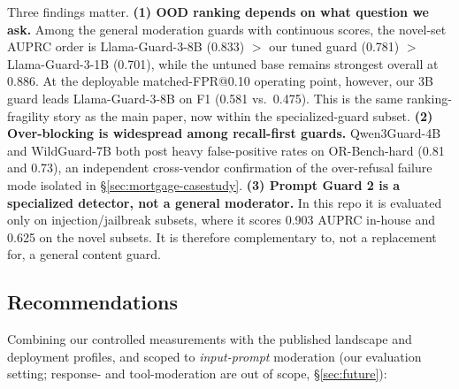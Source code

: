 Three findings matter. \textbf{(1) OOD ranking depends on what question we ask.} Among the general moderation guards with continuous scores, the novel-set AUPRC order is Llama-Guard-3-8B (0.833) $>$ our tuned guard (0.781) $>$ Llama-Guard-3-1B (0.701), while the untuned base remains strongest overall at 0.886. At the deployable matched-FPR@0.10 operating point, however, our 3B guard leads Llama-Guard-3-8B on F1 (0.581 vs.\ 0.475). This is the same ranking-fragility story as the main paper, now within the specialized-guard subset. \textbf{(2) Over-blocking is widespread among recall-first guards.} Qwen3Guard-4B and WildGuard-7B both post heavy false-positive rates on OR-Bench-hard (0.81 and 0.73), an independent cross-vendor confirmation of the over-refusal failure mode isolated in \S\ref{sec:mortgage-casestudy}. \textbf{(3) Prompt Guard 2 is a specialized detector, not a general moderator.} In this repo it is evaluated only on injection/jailbreak subsets, where it scores 0.903 AUPRC in-house and 0.625 on the novel subsets. It is therefore complementary to, not a replacement for, a general content guard.

\subsection{Recommendations}
\label{sec:recommendations}

Combining our controlled measurements with the published landscape and deployment profiles, and scoped to \emph{input-prompt} moderation (our evaluation setting; response- and tool-moderation are out of scope, \S\ref{sec:future}):

